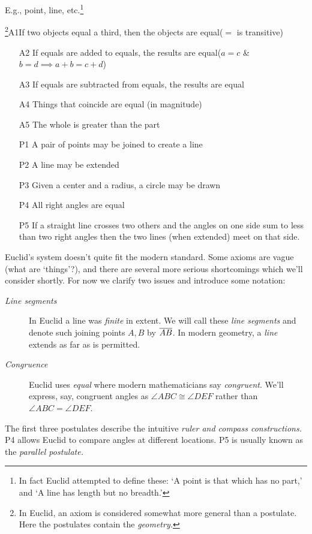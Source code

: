 
\begin{description}\itemsep0pt
	\item[\normalfont\emph{Undefined Terms}] E.g., point, line, etc.\footnote{In fact Euclid attempted to define these: `A point is that which has no part,' and `A line has length but no breadth.'}
	\item[\normalfont\emph{Axioms/Postulates}]\negthickspace\!\footnote{In Euclid, an axiom is considered somewhat more general than a postulate. Here the postulates contain the \emph{geometry.}}\lstsp A1\lstsp If two objects equal a third, then the objects are equal\hfill ($=$ is transitive)\vspace{-5pt}
		\begin{itemize}
		  	\item[A2] If equals are added to equals, the results are equal\hfill ($a=c$ \& $b=d\implies a+b=c+d$)
		  	\item[A3] If equals are subtracted from equals, the results are equal
		  	\item[A4] Things that coincide are equal (in magnitude)
		  	\item[A5] The whole is greater than the part
		  	\item[P1] A pair of points may be joined to create a line
		  	\item[P2] A line may be extended
		  	\item[P3] Given a center and a radius, a circle may be drawn
		  	\item[P4] All right angles are equal
		  	\item[P5] If a straight line crosses two others and the angles on one side sum to less than two right angles then the two lines (when extended) meet on that side.
		\end{itemize}
\end{description}

\goodbreak


Euclid's system doesn't quite fit the modern standard. Some axioms are vague (what are `things'?), and there are several more serious shortcomings which we'll consider shortly. For now we clarify two issues and introduce some notation:
\begin{description}
	\item[\normalfont\emph{Line segments}] In Euclid a line was \emph{finite} in extent. We will call these \emph{line segments} and denote such joining points $A,B$ by $\overline{AB}$. In modern geometry, a \emph{line} extends as far as is permitted.
	\item[\normalfont\emph{Congruence}] Euclid uses \emph{equal} where modern mathematicians say \emph{congruent}. We'll express, say, congruent angles as $\angle ABC\cong\angle DEF$ rather than $\angle ABC=\angle DEF$.
\end{description}
The first three postulates describe the intuitive \emph{ruler and compass constructions.} P4 allows Euclid to compare angles at different locations. P5 is usually known as the \emph{parallel postulate.}


